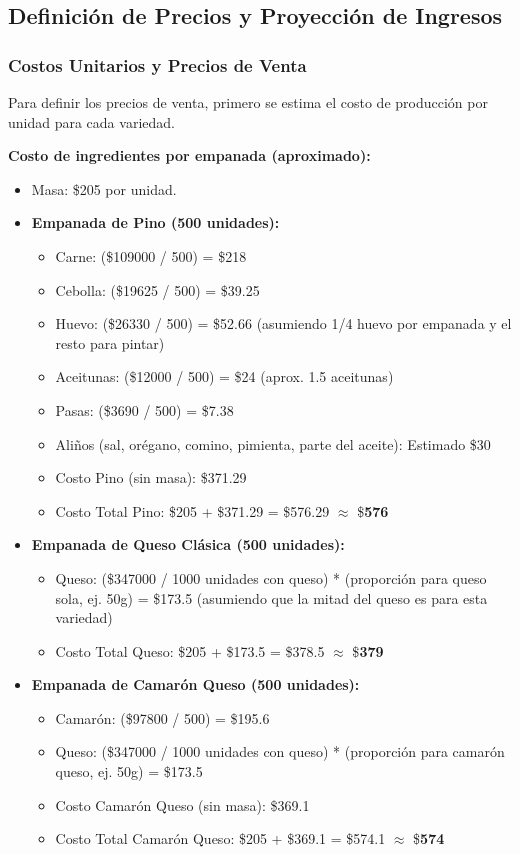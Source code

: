 \documentclass[12pt]{article}
\begin{document}
\subsection{Definición de Precios y Proyección de Ingresos}
\subsubsection{Costos Unitarios y Precios de Venta}
Para definir los precios de venta, primero se estima el costo de producción por unidad para cada variedad.

\textbf{Costo de ingredientes por empanada (aproximado):}
\begin{itemize}
    \item Masa: \$\num{205} por unidad.
    \item \textbf{Empanada de Pino (500 unidades):}
    \begin{itemize}
        \item Carne: (\$\num{109000} / 500) = \$\num{218}
        \item Cebolla: (\$\num{19625} / 500) = \$\num{39.25}
        \item Huevo: (\$\num{26330} / 500) = \$\num{52.66} (asumiendo 1/4 huevo por empanada y el resto para pintar)
        \item Aceitunas: (\$\num{12000} / 500) = \$\num{24} (aprox. 1.5 aceitunas)
        \item Pasas: (\$\num{3690} / 500) = \$\num{7.38}
        \item Aliños (sal, orégano, comino, pimienta, parte del aceite): Estimado \$\num{30}
        \item Costo Pino (sin masa): \$\num{371.29}
        \item Costo Total Pino: \$\num{205} + \$\num{371.29} = \$\num{576.29} $\approx$ \$\textbf{\num{576}}
    \end{itemize}
    \item \textbf{Empanada de Queso Clásica (500 unidades):}
    \begin{itemize}
        \item Queso: (\$\num{347000} / 1000 unidades con queso) * (proporción para queso sola, ej. 50g) = \$\num{173.5} (asumiendo que la mitad del queso es para esta variedad)
        \item Costo Total Queso: \$\num{205} + \$\num{173.5} = \$\num{378.5} $\approx$ \$\textbf{\num{379}}
    \end{itemize}
    \item \textbf{Empanada de Camarón Queso (500 unidades):}
    \begin{itemize}
        \item Camarón: (\$\num{97800} / 500) = \$\num{195.6}
        \item Queso: (\$\num{347000} / 1000 unidades con queso) * (proporción para camarón queso, ej. 50g) = \$\num{173.5}
        \item Costo Camarón Queso (sin masa): \$\num{369.1}
        \item Costo Total Camarón Queso: \$\num{205} + \$\num{369.1} = \$\num{574.1} $\approx$ \$\textbf{\num{574}}
    \end{itemize}
\end{itemize}
\end{document}
